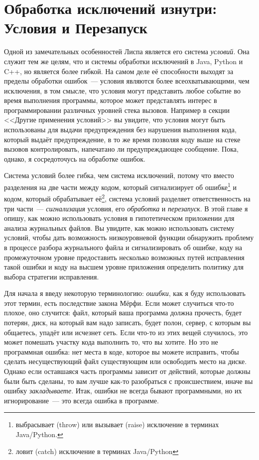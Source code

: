 \chapter{Обработка исключений изнутри: Условия и Перезапуск}
\label{ch:19}

Одной из замечательных особенностей Лиспа является его система \textit{условий}. Она
служит тем же целям, что и системы обработки исключений в Java, Python и C++, но является
более гибкой. На самом деле её способности выходят за пределы обработки ошибок~--- условия
являются более всеохватывающими, чем исключения, в том смысле, что условия могут
представить любое событие во время выполнения программы, которое может представлять
интерес в программировании различных уровней стека вызовов. Например в секции <<Другие
применения условий>> вы увидите, что условия могут быть использованы для выдачи
предупреждения без нарушения выполнения кода, который выдаёт предупреждение, в то же время
позволяя коду выше на стеке вызовов контролировать, напечатано ли предупреждающее
сообщение. Пока, однако, я сосредоточусь на обработке ошибок.

Система условий более гибка, чем система исключений, потому что вместо разделения на две
части между кодом, который сигнализирует об ошибке\footnote{выбрасывает (throw) или
  вызывает (raise) исключение в терминах Java/Python.} и кодом, который обрабатывает
её\footnote{ловит (catch) исключение в терминах Java/Python}, система условий разделяет
ответственность на три части~--- \textit{сигнализация} условия, его \textit{обработка} и
\textit{перезапуск}. В этой главе я опишу, как можно использовать условия в гипотетическом
приложении для анализа журнальных файлов. Вы увидите, как можно использовать систему
условий, чтобы дать возможность низкоуровневой функции обнаружить проблему в процессе
разбора журнального файла и сигнализировать об ошибке, коду на промежуточном уровне
предоставить несколько возможных путей исправления такой ошибки и коду на высшем уровне
приложения определить политику для выбора стратегии исправления.

Для начала я введу некоторую терминологию: \textit{ошибки}, как я буду использовать этот
термин, есть последствие закона Мёрфи. Если может случиться что-то плохое, оно случится:
файл, который ваша программа должна прочесть, будет потерян, диск, на который вам надо
записать, будет полон, сервер, с которым вы общаетесь, упадёт или исчезнет сеть. Если
что-то из этих вещей случилось, это может помешать участку кода выполнить то, что вы
хотите. Но это не программная ошибка: нет места в коде, которое вы можете исправить, чтобы
сделать несуществующий файл существующим или освободить место на диске. Однако если
оставшаяся часть программы зависит от действий, которые должны были быть сделаны, то вам
лучше как-то разобраться с происшествием, иначе вы ошибку \textit{закладываете}. Итак,
ошибки не всегда бывают программными, но их игнорирование~--- это всегда ошибка в
программе.

